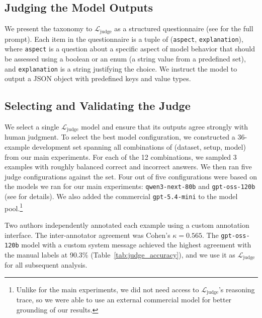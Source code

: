 \documentclass[11pt]{article}
\newcommand{\ljudge}{$\mathcal{L}_{\text{judge}}$}
\begin{document}
\subsection{Judging the Model Outputs}
\label{sec:judging}

We present the taxonomy to \ljudge{} as a structured questionnaire (see  for the full prompt). Each item in the questionnaire is a tuple of (\texttt{aspect}, \texttt{explanation}), where \texttt{aspect} is a question about a specific aspect of model behavior that should be assessed using a boolean or an enum (a string value from a predefined set), and \texttt{explanation} is a string justifying the choice. We instruct the model to output a JSON object with predefined keys and value types.

\subsection{Selecting and Validating the Judge}
\label{sec:selecting}
We select a single \ljudge{} model and ensure that its outputs agree strongly with human judgment. To select the best model configuration, we constructed a 36-example development set spanning all combinations of (dataset, setup, model) from our main experiments. For each of the 12 combinations, we sampled 3 examples with roughly balanced correct and incorrect answers. We then ran five judge configurations against the set. Four out of five configurations were based on the models we ran for our main experiments: \texttt{qwen3-next-80b} and \texttt{gpt-oss-120b} (see  for details). We also added the commercial \texttt{gpt-5.4-mini} to the model pool.\footnote{Unlike for the main experiments, we did not need access to \ljudge{}'s reasoning trace, so we were able to use an external commercial model for better grounding of our results.}

Two authors independently annotated each example using a custom annotation interface. The inter-annotator agreement was Cohen's $\kappa = 0.565$. The \texttt{gpt-oss-120b} model with a custom system message achieved the highest agreement with the manual labels at 90.3\% (Table~\ref{tab:judge_accuracy}), and we use it as \ljudge{} for all subsequent analysis.
\end{document}
